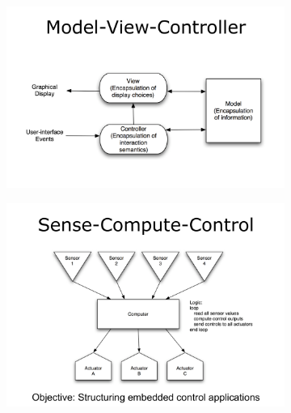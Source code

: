 \documentclass[a4paper]{report}
\begin{document}
\begin{figure}[H]
\hskip-2.5cm\begin{subfigure}{1.2\textwidth}
  \includegraphics[width=1.2\linewidth]
  {images/3-model-view-controller.png}
\end{subfigure}
\end{figure}


\begin{figure}[H]
\hskip-2.5cm\begin{subfigure}{1.2\textwidth}
  \includegraphics[width=1.2\linewidth]
  {images/3-sense-compute-control.png}
\end{subfigure}
\end{figure}


\newpage
\end{document}
